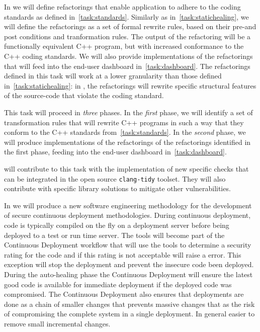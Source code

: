 \begin{Workpackage}{\thewpno}
\begin{Task}
     	In \theTask{} we will define refactorings that enable application to adhere to the coding standards as defined in~\ref{task:standards}. Similarly as in~\ref{task:statichealing}, we will define the refactorings as a set of formal rewrite rules, based on their pre-and post conditions and tranformation rules. The output of the refactoring will be a functionally equivalent C++ program, but with increased conformance to the C++ coding standards. We will also provide implementations of the refactorings that will feed into the end-user dashboard in~\ref{task:dashboard}. The refactorings defined in this task will work at a lower granularity than those defined in~\ref{task:statichealing}: in \theTask{}, the refactorings will rewrite specific structural features of the source-code that violate the coding standard. 
     
     This task will proceed in \emph{three} phases. In the \emph{first} phase, we will identify a set of transformation rules that will rewrite C++ programs in such a way that they conform to the C++ standards from~\ref{task:standards}. In the \emph{second} phase, we will produce implementations of the refactorings of the refactorings identified in the first phase, feeding into the end-user dashboard in~\ref{task:dashboard}.

        \UCMshort{} will contribute to this task with the implementation
        of new specific checks that can be integrated in the open source
        \texttt{clang-tidy} toolset. They will also contribute with specific
        library solutions to mitigate other vulnerabilities. 
\end{Task}

\begin{Task}



\TaskResults{%
}
\TaskHeader{}

In \theTask  we will produce a new software engineering methodology for the development of secure continuous deployment methodologies.  During continuous deployment, code is typically compiled on the fly on a deployment server before being deployed to a test or run time server.  The \TheProject{} tools will become part of the Continuous Deployment workflow that will use the tools to determine a security rating for the code and if this rating is not acceptable will raise a error. This exception will stop the deployment and prevent the insecure code been deployed.
During the auto-healing phase the Continuous Deployment will ensure the latest good code is available for immediate deployment if the deployed code was compromised. The Continuous Deployment also ensures that deployments are done as a chain of smaller changes that prevents massive changes that as the risk of compromising the complete system in a single deployment. In general easier to remove small incremental changes.


\end{Task}
\end{Workpackage}

